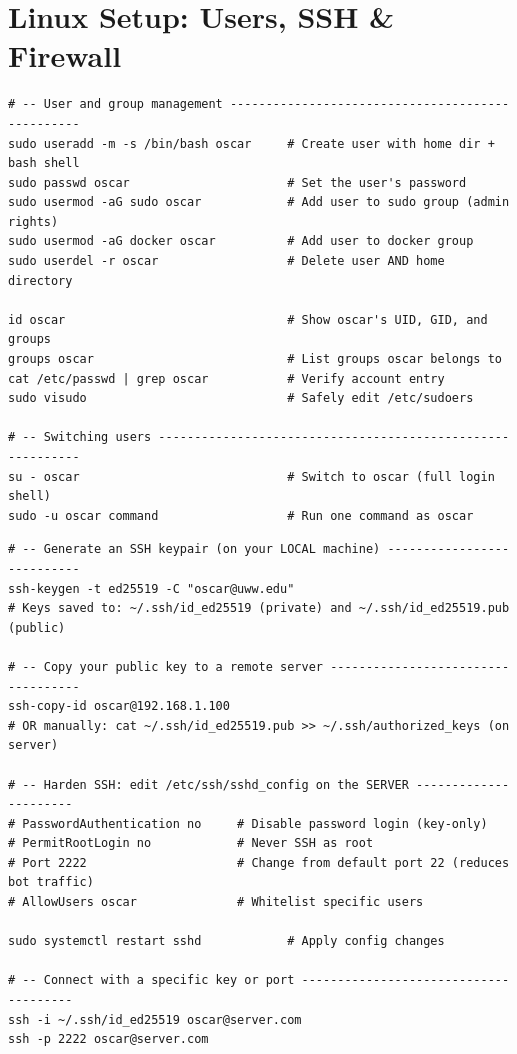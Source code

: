 \documentclass[11pt, letterpaper]{article}
\begin{document}
\section*{Linux Setup: Users, SSH \& Firewall}

\begin{lstlisting}[style=shell, caption={User management}]
# -- User and group management -------------------------------------------------
sudo useradd -m -s /bin/bash oscar     # Create user with home dir + bash shell
sudo passwd oscar                      # Set the user's password
sudo usermod -aG sudo oscar            # Add user to sudo group (admin rights)
sudo usermod -aG docker oscar          # Add user to docker group
sudo userdel -r oscar                  # Delete user AND home directory

id oscar                               # Show oscar's UID, GID, and groups
groups oscar                           # List groups oscar belongs to
cat /etc/passwd | grep oscar           # Verify account entry
sudo visudo                            # Safely edit /etc/sudoers

# -- Switching users -----------------------------------------------------------
su - oscar                             # Switch to oscar (full login shell)
sudo -u oscar command                  # Run one command as oscar
\end{lstlisting}

\begin{lstlisting}[style=shell, caption={SSH setup and hardening}]
# -- Generate an SSH keypair (on your LOCAL machine) ---------------------------
ssh-keygen -t ed25519 -C "oscar@uww.edu"
# Keys saved to: ~/.ssh/id_ed25519 (private) and ~/.ssh/id_ed25519.pub (public)

# -- Copy your public key to a remote server -----------------------------------
ssh-copy-id oscar@192.168.1.100
# OR manually: cat ~/.ssh/id_ed25519.pub >> ~/.ssh/authorized_keys (on server)

# -- Harden SSH: edit /etc/ssh/sshd_config on the SERVER ----------------------
# PasswordAuthentication no     # Disable password login (key-only)
# PermitRootLogin no            # Never SSH as root
# Port 2222                     # Change from default port 22 (reduces bot traffic)
# AllowUsers oscar              # Whitelist specific users

sudo systemctl restart sshd            # Apply config changes

# -- Connect with a specific key or port --------------------------------------
ssh -i ~/.ssh/id_ed25519 oscar@server.com
ssh -p 2222 oscar@server.com
\end{lstlisting}
\end{document}
